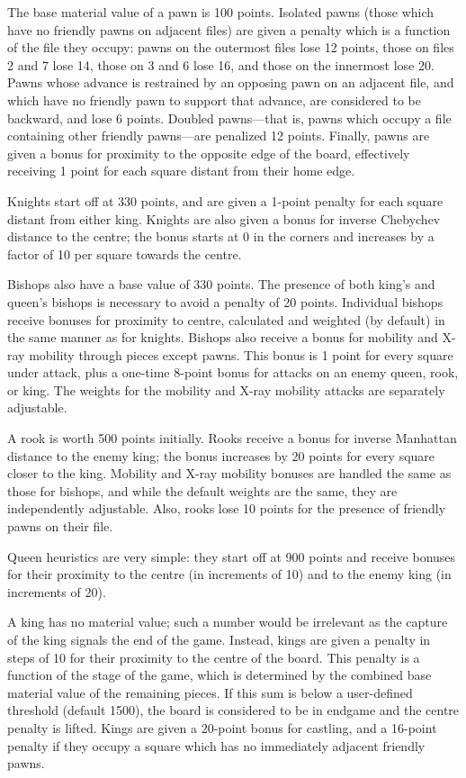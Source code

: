 \documentclass[12pt]{article}
\begin{document}
The base material value of a pawn is 100 points. Isolated pawns (those
which have no friendly pawns on adjacent files) are given a penalty
which is a function of the file they occupy: pawns on the outermost
files lose 12 points, those on files 2 and 7 lose 14, those on 3 and 6
lose 16, and those on the innermost lose 20. Pawns whose advance is
restrained by an opposing pawn on an adjacent file, and which have no
friendly pawn to support that advance, are considered to be backward,
and lose 6 points. Doubled pawns---that is, pawns which occupy a file
containing other friendly pawns---are penalized 12 points. Finally,
pawns are given a bonus for proximity to the opposite edge of the
board, effectively receiving 1 point for each square distant from
their home edge.

Knights start off at 330 points, and are given a 1-point penalty for
each square distant from either king. Knights are also given a bonus
for inverse Chebychev distance to the centre; the bonus starts at 0 in
the corners and increases by a factor of 10 per square towards the
centre.

Bishops also have a base value of 330 points. The presence of both
king's and queen's bishops is necessary to avoid a penalty of 20
points. Individual bishops receive bonuses for proximity to centre,
calculated and weighted (by default) in the same manner as for
knights. Bishops also receive a bonus for mobility and X-ray mobility
through pieces except pawns. This bonus is 1 point for every square
under attack, plus a one-time 8-point bonus for attacks on an enemy
queen, rook, or king. The weights for the mobility and X-ray mobility
attacks are separately adjustable.

A rook is worth 500 points initially. Rooks receive a bonus for
inverse Manhattan distance to the enemy king; the bonus increases by
20 points for every square closer to the king. Mobility and X-ray
mobility bonuses are handled the same as those for bishops, and while
the default weights are the same, they are independently adjustable.
Also, rooks lose 10 points for the presence of friendly pawns on their
file.

Queen heuristics are very simple: they start off at 900 points and
receive bonuses for their proximity to the centre (in increments of
10) and to the enemy king (in increments of 20).

A king has no material value; such a number would be irrelevant as the
capture of the king signals the end of the game. Instead, kings are
given a penalty in steps of 10 for their proximity to the centre of
the board. This penalty is a function of the stage of the game, which
is determined by the combined base material value of the remaining
pieces. If this sum is below a user-defined threshold (default 1500),
the board is considered to be in endgame and the centre penalty is
lifted. Kings are given a 20-point bonus for castling, and a 16-point
penalty if they occupy a square which has no immediately adjacent
friendly pawns.
\end{document}
